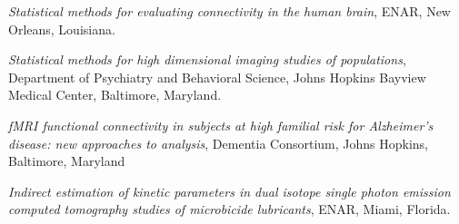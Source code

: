 \documentclass[12pt]{article}
\begin{document}
\begin{description}
\begin{description}
    \item {\it Statistical methods for evaluating connectivity in the human brain}, ENAR, New Orleans, Louisiana. 
    \item {\it Statistical methods for high dimensional imaging studies of populations}, Department of Psychiatry and Behavioral Science, 
Johns Hopkins Bayview Medical Center, Baltimore, Maryland. 
  \end{description}
\item[\textnormal{2011}]
    \begin{description}
	\item {\it fMRI functional connectivity in subjects at high familial risk for Alzheimer's disease: new approaches to analysis}, Dementia Consortium, Johns Hopkins, Baltimore, Maryland
    \item {\it Indirect estimation of kinetic parameters in dual isotope single photon emission computed tomography studies of  microbicide lubricants}, ENAR, Miami, Florida.


\end{description}
\end{description}
\end{document}
